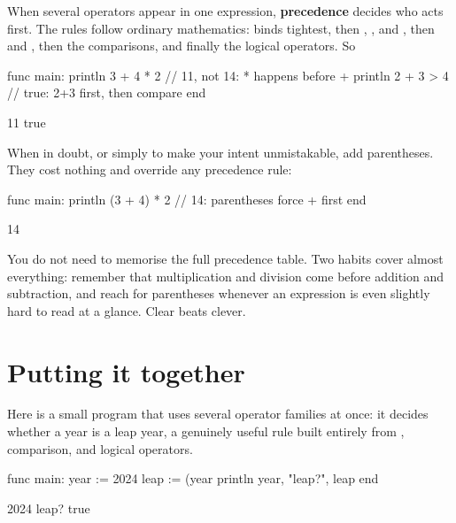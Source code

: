 When several operators appear in one expression, \textbf{precedence} decides who
acts first. The rules follow ordinary mathematics: \code{**} binds tightest, then
\code{*}, \code{/}, and \code{\%}, then \code{+} and \code{-}, then the
comparisons, and finally the logical operators. So

\begin{salamen}
func main:
    println 3 + 4 * 2          // 11, not 14: * happens before +
    println 2 + 3 > 4          // true: 2+3 first, then compare
end
\end{salamen}

\begin{progout}
11
true
\end{progout}

When in doubt, or simply to make your intent unmistakable, add parentheses.
They cost nothing and override any precedence rule:

\begin{salamen}
func main:
    println (3 + 4) * 2        // 14: parentheses force + first
end
\end{salamen}

\begin{progout}
14
\end{progout}

\begin{tip}
You do not need to memorise the full precedence table. Two habits cover almost
everything: remember that multiplication and division come before addition and
subtraction, and reach for parentheses whenever an expression is even slightly
hard to read at a glance. Clear beats clever.
\end{tip}

\section{Putting it together}

Here is a small program that uses several operator families at once: it decides
whether a year is a leap year, a genuinely useful rule built entirely from
\code{\%}, comparison, and logical operators.

\begin{salamen}
func main:
    year := 2024
    leap := (year %
    println year, "leap?", leap
end
\end{salamen}

\begin{progout}
2024 leap? true
\end{progout}

